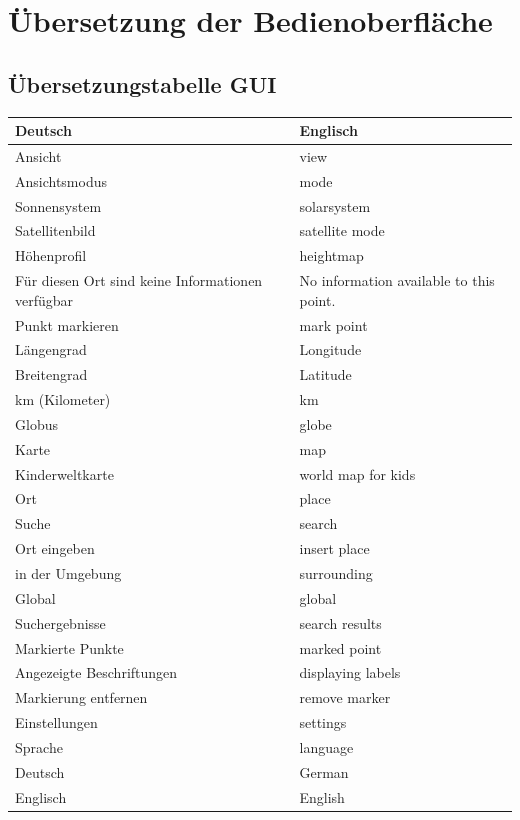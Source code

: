 \documentclass[10pt]{scrreprt}
\begin{document}
\chapter{Übersetzung der Bedienoberfläche}

\section{Übersetzungstabelle GUI}
\begin{longtable}{|p{7.5cm}|p{7.5cm}|}
\hline 
\textbf{Deutsch} & \textbf{Englisch} \\ 
\hline
\hline 
Ansicht & view \\ 
\hline
Ansichtsmodus & mode \\ 
\hline
Sonnensystem & solarsystem \\
\hline
Satellitenbild & satellite mode \\
\hline
Höhenprofil & heightmap \\
\hline
Für diesen Ort sind keine Informationen verfügbar & No information available to this point. \\
\hline
Punkt markieren & mark point\\
\hline
Längengrad & Longitude \\
\hline
Breitengrad & Latitude \\
\hline
km (Kilometer) & km \\
\hline
Globus & globe \\
\hline
Karte & map \\
\hline
Kinderweltkarte & world map for kids \\
\hline
Ort & place \\
\hline
Suche & search \\
\hline
Ort eingeben & insert place \\
\hline
in der Umgebung & surrounding \\
\hline
Global & global \\
\hline
Suchergebnisse & search results \\
\hline
Markierte Punkte & marked point \\
\hline
Angezeigte Beschriftungen & displaying labels \\
\hline
Markierung entfernen & remove marker \\
\hline
Einstellungen & settings \\
\hline
Sprache & language \\
\hline
Deutsch & German \\
\hline
Englisch & English \\

\end{longtable}
\end{document}
